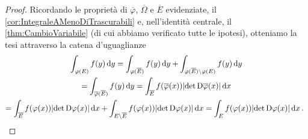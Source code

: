 \begin{proof}
	Ricordando le proprietà di $\overline\varphi$, $\overline\Omega$ e $\overline E$ evidenziate, il \cref{cor:IntegraleAMenoDiTrascurabili} e, nell'identità centrale, il \cref{thm:CambioVariabile} (di cui abbiamo verificato tutte le ipotesi), otteniamo la tesi attraverso la catena d'uguaglianze
	\begin{multline*}
		\int_{\varphi(E)} f(y)\,\mathrm d y=\int_{\varphi(\overline E)} f(y)\,\mathrm d y+\int_{\varphi(\overline E)\setminus\varphi(E)}f(y)\,\mathrm d y \\
		=\int_{\overline\varphi(\overline E)} f(y)\,\mathrm d y=\int_{\overline E} f(\overline\varphi(x))\lvert \det \mathrm D \overline\varphi(x) \rvert \,\mathrm d x \\
		=\int_{\overline E}f(\varphi(x))\lvert \det \mathrm D \varphi(x) \rvert \,\mathrm d x+
		 \int_{E\setminus\overline E}f(\varphi(x))\lvert \det \mathrm D \varphi(x) \rvert \,\mathrm d x=\int_{E}f(\varphi(x))\lvert \det \mathrm D \varphi(x) \rvert \,\mathrm d x \, \text{. }
	\end{multline*}
\end{proof}

